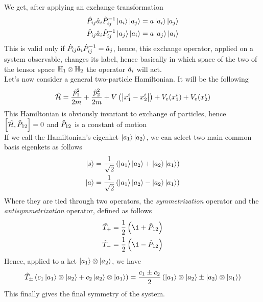 \documentclass[../qm.tex]{subfiles}
\begin{document}
	We get, after applying an exchange transformation
	\begin{equation*}
		\begin{aligned}
			\hat{P}_{ij}\hat{a}_i\hat{P}_{ij}^{-1}\ket{a_i}\ket{a_j}&=a\ket{a_i}\ket{a_j}\\
			\hat{P}_{ij}\hat{a}_i\hat{P}_{ij}^{-1}\ket{a_j}\ket{a_i}&=a\ket{a_j}\ket{a_i}
		\end{aligned}
	\end{equation*}
	This is valid only if $\hat{P}_{ij}\hat{a}_i\hat{P}_{ij}^{-1}=\hat{a}_j$, hence, this exchange operator, applied on a system observable, changes its label, hence basically in which space of the two of the tensor space $\mathbb{H}_1\otimes\mathbb{H}_2$ the operator $\hat{a}_i$ will act.\\
	Let's now consider a general two-particle Hamiltonian. It will be the following
	\begin{equation}
		\hat{\mathcal{H}}=\frac{\hat{p}^2_1}{2m}+\frac{\hat{p}^2_2}{2m}+V\left(\abs{x^i_1-x^i_2}\right)+V_e(x_1^i)+V_e(x_2^i)
		\label{eq:2parthamiltonian}
	\end{equation}
	This Hamiltonian is obviously invariant to exchange of particles, hence $\comm{\opr{\ham}}{\opr{P}_{12}}=0$ and $\hat{P}_{12}$ is a constant of motion\\
	If we call the Hamiltonian's eigenket $\ket{a_1}\ket{a_2}$, we can select two main common basis eigenkets as follows
	\begin{equation*}
		\begin{aligned}
			\ket{s}&=\frac{1}{\sqrt{2}}\left( \ket{a_1}\ket{a_2}+\ket{a_2}\ket{a_1} \right)\\
			\ket{a}&=\frac{1}{\sqrt{2}}\left( \ket{a_1}\ket{a_2}-\ket{a_2}\ket{a_1} \right)
		\end{aligned}
	\end{equation*}
	Where they are tied through two operators, the \textit{symmetrization} operator and the \textit{antisymmetrization} operator, defined as follows
	\begin{equation}
		\begin{aligned}
			\ladopru{T}&=\frac{1}{2}\left( \1+\opr{P}_{12} \right)\\
			\ladoprd{T}&=\frac{1}{2}\left( \1-\opr{P}_{12} \right)
		\end{aligned}
		\label{eq:antisimmsimmopr}
	\end{equation}
	Hence, applied to a ket $\ket{a_1}\otimes\ket{a_2}$, we have
	\begin{equation*}
		\hat{T}_{\pm}\left( c_1\ket{a_1}\otimes\ket{a_2}+c_2\ket{a_2}\otimes\ket{a_1} \right)=\frac{c_1\pm c_2}{2}\left( \ket{a_1}\otimes\ket{a_2}\pm\ket{a_2}\otimes\ket{a_1} \right)
	\end{equation*}
	This finally gives the final symmetry of the system.
\end{document}
